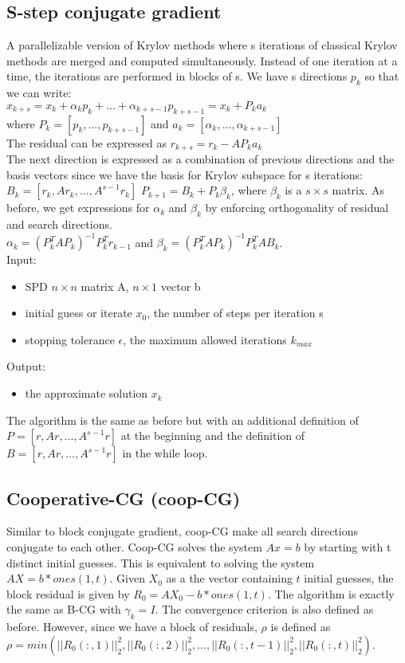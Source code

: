 \documentclass[]{scrartcl}
\begin{document}
\subsection{S-step conjugate gradient}
A parallelizable version of Krylov methods where s iterations of classical Krylov methods are merged and computed simultaneously. Instead of one iteration at a time, the iterations are performed in blocks of s.
We have s directions $p_{k}$ so that we can write: \\ $x_{k+s}=x_{k}+\alpha_{k}p_{k}+...+\alpha_{k+s-1}p_{k+s-1}=x_{k}+P_{k}a_{k}$ \\ where $P_{k}=[p_{k}, ..., p_{k+s-1}]$ and $a_{k}=[\alpha_{k}, ..., \alpha_{k+s-1}]$ \\
The residual can be expressed as $r_{k+s}=r_{k}-AP_{k}a_{k}$ \\
The next direction is expressed as a combination of previous directions and the basis vectors since we have the basis for Krylov subspace for s iterations: $B_{k}=[r_{k}, Ar_{k}, ..., A^{s-1}r_{k}]$
$P_{k+1}=B_{k}+P_{k}\beta_{k}$, where $\beta_{k}$ is a $s\times s$ matrix.
As before, we get expressions for $\alpha_{k}$ and $\beta_{k}$ by enforcing orthogonality of residual and search directions.\\
$\alpha_{k}=(P^{T}_{k}AP_{k})^{-1}P^{T}_{k}r_{k-1}  $ and $\beta_{k}=(P^{T}_{k}AP_{k})^{-1}P^{T}_{k}AB_{k}$. \\
Input: 
\begin{itemize}
	\item SPD $n\times n$ matrix A, $n\times 1$ vector b
	\item initial guess or iterate $x_{0}$, the number of steps per iteration s
	\item stopping tolerance $\epsilon$, the maximum allowed iterations $k_{max}$ 
\end{itemize}
Output:
\begin{itemize}
	\item the approximate solution $x_{k}$ 
\end{itemize}
The algorithm is the same as before but with an additional definition of $P=[r, Ar, ..., A^{s-1}r]$ at the beginning and the definition of $B=[r, Ar, ..., A^{s-1}r]$ in the while loop.
\subsection{Cooperative-CG (coop-CG)}
Similar to block conjugate gradient, coop-CG make all search directions conjugate to each other. Coop-CG solves the system $Ax=b$ by starting with t distinct initial guesses. This is equivalent to solving the system $AX=b*ones(1,t)$. Given $X_{0}$ as a the vector containing $t$ initial guesses, the block residual is given by $R_{0}=AX_{0}-b*ones(1,t)$. The algorithm is exactly the same as B-CG with $\gamma_{k}=I$. The convergence criterion is also defined as before. However, since we have a block of residuals, $\rho$ is defined as $\rho=min(||R_{0}(:,1)||_{2}^{2}, ||R_{0}(:,2)||_{2}^{2}, ..., ||R_{0}(:,t-1)||_{2}^{2}, ||R_{0}(:,t)||_{2}^{2})$.
\end{document}
